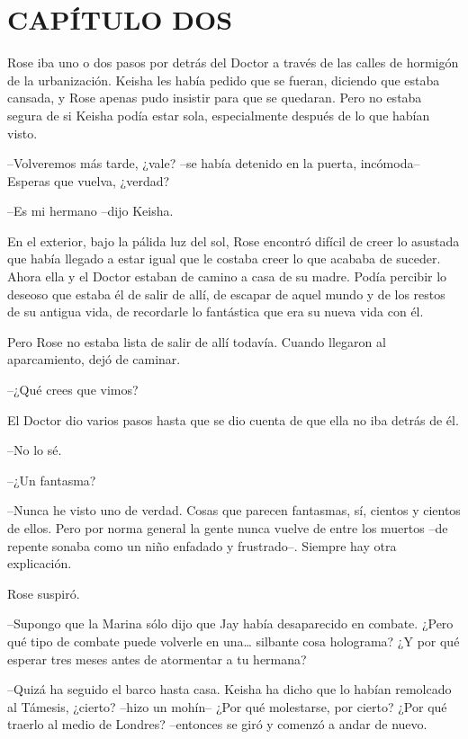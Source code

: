 \chapter*{CAPÍTULO DOS}

{Rose iba uno o dos pasos por detrás del Doctor a través de las calles
 de hormigón de la urbanización. Keisha les había pedido que se fueran,
 diciendo que estaba cansada, y Rose apenas pudo insistir para que se
 quedaran. Pero no estaba segura de si Keisha podía estar sola,
especialmente después de lo que habían visto.}

{--Volveremos más tarde, ¿vale? --se había detenido en la puerta,
incómoda-- Esperas que vuelva, ¿verdad?}

{--Es mi hermano --dijo Keisha.}

{En el exterior, bajo la pálida luz del sol, Rose encontró difícil de
 creer lo asustada que había llegado a estar igual que le costaba creer
 lo que acababa de suceder. Ahora ella y el Doctor estaban de camino a
 casa de su madre. Podía percibir lo deseoso que estaba él de salir de
 allí, de escapar de aquel mundo y de los restos de su antigua vida, de
recordarle lo fantástica que era su nueva vida con él.}

{Pero Rose no estaba lista de salir de allí todavía. Cuando llegaron al
aparcamiento, dejó de caminar.}

{--¿Qué crees que vimos?}

{El Doctor dio varios pasos hasta que se dio cuenta de que ella no iba
detrás de él.}

{--No lo sé.}

{--¿Un fantasma?}

{--Nunca he visto uno de verdad. Cosas que parecen fantasmas, sí,
 cientos y cientos de ellos. Pero por norma general la gente nunca vuelve
 de entre los muertos --de repente sonaba como un niño enfadado y
frustrado--. Siempre hay otra explicación.}

{Rose suspiró.}

{--Supongo que la Marina sólo dijo que Jay había desaparecido en
 combate. ¿Pero qué tipo de combate puede volverle en una\ldots{}
 silbante cosa holograma? ¿Y por qué esperar tres meses antes de
atormentar a tu hermana?}

{--Quizá ha seguido el barco hasta casa. Keisha ha dicho que lo habían
 remolcado al Támesis, ¿cierto? --hizo un mohín-- ¿Por qué molestarse,
 por cierto? ¿Por qué traerlo al medio de Londres? --entonces se giró y
comenzó a andar de nuevo.}

